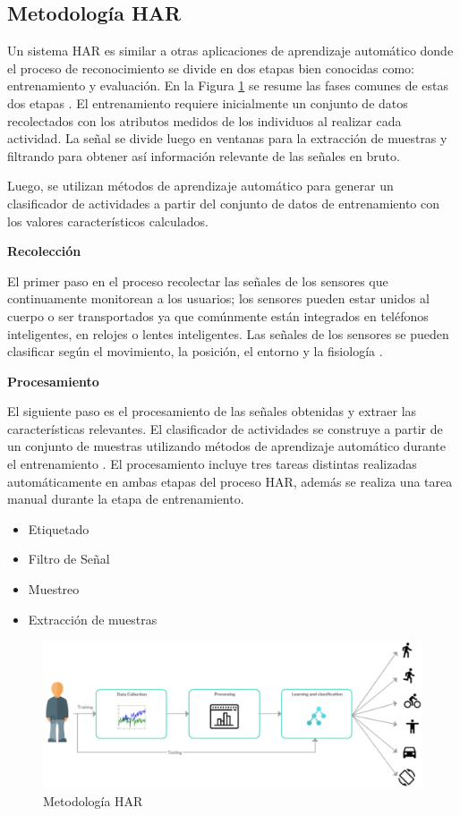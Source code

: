 \documentclass{sciposter}
\begin{document}
\begin{multicols}{3}
\newcommand{\imsize}{0.45\columnwidth}

\section{Metodología HAR}

Un sistema HAR es similar a otras aplicaciones de aprendizaje automático donde el proceso de reconocimiento se divide en dos etapas bien conocidas como: entrenamiento y evaluación. En la Figura \ref{fig:harsystem2} se resume las fases comunes de estas dos etapas \cite{LaraLabrador2013}. El entrenamiento requiere inicialmente un conjunto de datos recolectados con los atributos medidos de los individuos al realizar cada actividad. La señal se divide luego en ventanas para la extracción de muestras y filtrando para obtener así información relevante de las señales en bruto.

Luego, se utilizan métodos de aprendizaje automático para generar un clasificador de actividades a partir del conjunto de datos de entrenamiento con los valores característicos calculados.

\textbf{Recolección}

El primer paso en el proceso recolectar las señales de los sensores que continuamente monitorean a los usuarios; los sensores pueden estar unidos al cuerpo o ser transportados ya que comúnmente están integrados en teléfonos inteligentes, en relojes o lentes inteligentes. Las señales de los sensores se pueden clasificar según el movimiento, la posición, el entorno y la fisiología \cite{LaraLabrador2013}.

\textbf{Procesamiento}

El siguiente paso es el procesamiento de las señales obtenidas y extraer las características relevantes. El clasificador de actividades se construye a partir de un conjunto de muestras utilizando métodos de aprendizaje automático durante el entrenamiento \cite{reyes}. El procesamiento incluye tres tareas distintas realizadas automáticamente en ambas etapas del proceso HAR, además se realiza una tarea manual durante la etapa de entrenamiento.
\begin{itemize}
	\item Etiquetado
	\item Filtro de Señal
	\item Muestreo
	\item Extracción de muestras
\end{itemize}

\begin{figure}
	\centering
	\includegraphics[width=0.7\linewidth]{../capitulo-2/graphics/harsystem2}
	\caption{Metodología HAR}
	\label{fig:harsystem2}
\end{figure}


\end{multicols}
\end{document}
